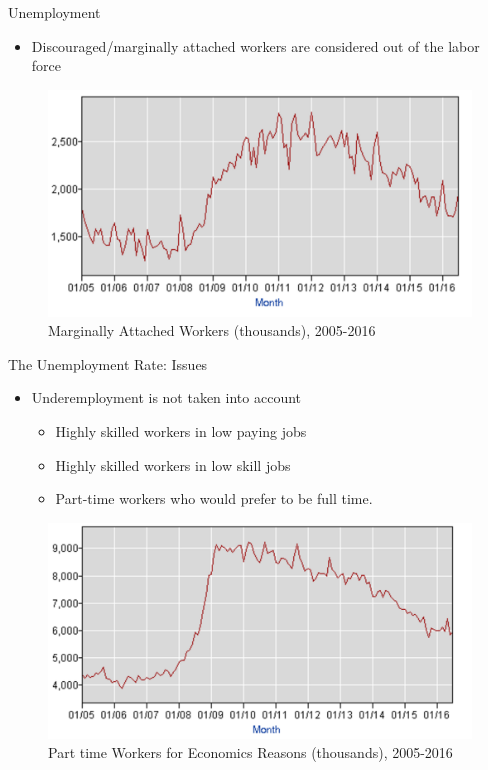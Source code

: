 \documentclass[xcolor={dvipsnames},pdf, hyperref={colorlinks=true, citecolor=ForestGreen, linkcolor=BlueViolet, urlcolor=Magenta}]{beamer}
\theoremstyle{definition}
\begin{document}
\begin{frame}{Unemployment}
	\begin{itemize}
	\item Discouraged/marginally attached workers are considered out of the labor force
\end{itemize}
\begin{figure}
	\centering
	\includegraphics[scale=.4]{01C_10.png}
	\caption{Marginally Attached Workers (thousands), 2005-2016}
\end{figure}

\end{frame}


\begin{frame}{The Unemployment Rate: Issues}
	\begin{itemize}
		\item Underemployment is not taken into account
		\begin{itemize}
			\item Highly skilled workers in low paying jobs
			\item Highly skilled workers in low skill jobs  
			\item Part-time workers who would prefer to be full time.
		\end{itemize}
	\end{itemize}
	\begin{figure}
		\centering
		\includegraphics[scale=.4]{01C_12.png}
		\caption{Part time Workers for Economics Reasons (thousands), 2005-2016}
	\end{figure}
\end{frame}
\end{document}
